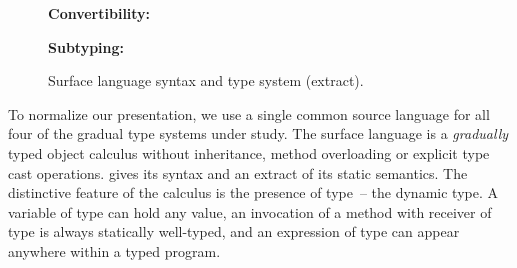 \documentclass[USenglish]{tex/lipics-v2016}
\begin{document}
\begin{figure}[!b]
\begin{mathpar}
\end{mathpar}


{\bf Convertibility:}\\[-6mm]
  
\begin{mathpar}
    
    
\end{mathpar}


{\bf Subtyping:}\\[-6mm]

\begin{mathpar}



\end{mathpar}

\hrulefill
\caption{Surface language syntax and type system (extract).}\label{slts}
\end{figure}

To normalize our presentation, we use a single common source language for all
four of the gradual type systems under study. The surface language is  a
\emph{gradually} typed object calculus without inheritance, method overloading
or explicit type cast operations.  gives its syntax and an
extract of its static semantics. The distinctive feature of the calculus  is
the presence of type \any\,-- the dynamic type. A variable of type \any can
hold any value, an invocation of a method with receiver of type \any is
always statically well-typed, and an expression of type \any can appear
anywhere within a typed program.
\end{document}
